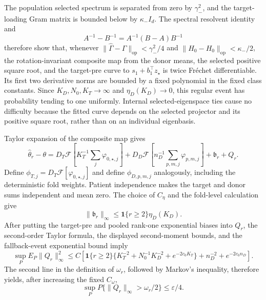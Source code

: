 The population selected spectrum is separated from zero by \(\gamma_-^2\), and the target-loading Gram matrix is bounded below by \(\kappa_-I_d\).  The spectral resolvent identity and
\[
 A^{-1}-B^{-1}=A^{-1}(B-A)B^{-1}
\]
therefore show that, whenever \(\|\widehat\Gamma-\Gamma\|_{\mathrm{op}}<\gamma_-^2/4\) and \(\|\widehat H_0-H_0\|_{\mathrm{op}}<\kappa_-/2\), the rotation-invariant composite map from the donor means, the selected positive square root, and the target-pre curve to \(s_1+b_1^\top z_\star\) is twice Fr\'echet differentiable.  Its first two derivative norms are bounded by a fixed polynomial in the fixed class constants.  Since \(K_D,N_0,K_T\to\infty\) and \(\eta_D(K_D)\to0\), this regular event has probability tending to one uniformly.  Internal selected-eigenspace ties cause no difficulty because the fitted curve depends on the selected projector and its positive square root, rather than on an individual eigenbasis.

Taylor expansion of the composite map gives
\[
 \widehat\theta_r-\theta
 =D_T\mathcal F\!\left[K_T^{-1}\sum_j\varphi_{0,\star,j}\right]
 +D_D\mathcal F\!\left[n_D^{-1}\sum_{p,m,j}\varphi_{p,m,j}\right]
 +\mathfrak b_r+Q_r.
\]
Define \(\phi_{T,j}=D_T\mathcal F[\varphi_{0,\star,j}]\) and define \(\phi_{D,p,m,j}\) analogously, including the deterministic fold weights.  Patient independence makes the target and donor sums independent and mean zero.  The choice of \(C_\eta\) and the fold-level calculation give
\[
 \|\mathfrak b_r\|_\infty\le\mathbf 1\{r\ge2\}\eta_D(K_D).
\]
After putting the target-pre and pooled rank-one exponential biases into \(Q_r\), the second-order Taylor formula, the displayed second-moment bounds, and the fallback-event exponential bound imply
\[
 \sup_P E_P\|Q_r\|_\infty^2
 \le C\left[
 \mathbf 1\{r\ge2\}\{K_T^{-2}+N_0^{-1}K_D^{-2}+e^{-2c_0K_T}\}
 +n_D^{-2}+e^{-2c_0n_D}
 \right].
\]
The second line in the definition of \(\omega_r\), followed by Markov's inequality, therefore yields, after increasing the fixed \(C_\omega\),
\[
 \sup_P P\{\|Q_r\|_\infty>\omega_r/2\}\le\varepsilon/4.
\]

